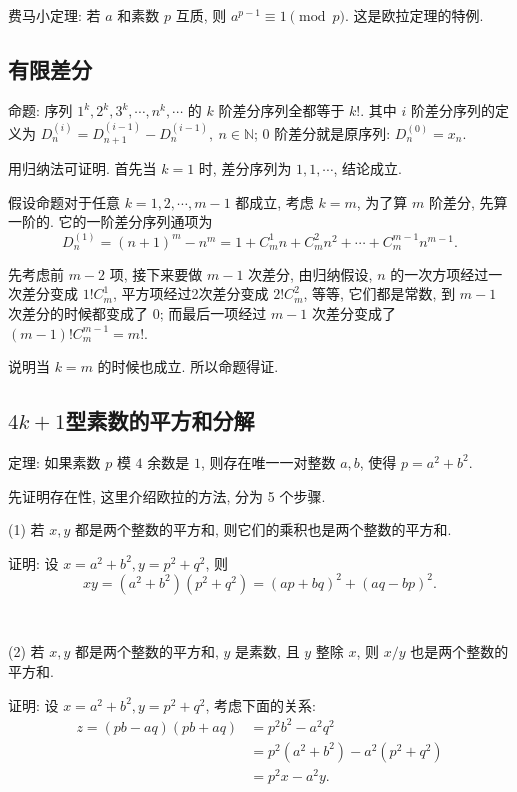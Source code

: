 ~

\noindent 费马小定理: 若 $ a $ 和素数 $ p $ 互质, 则 $ a^{p-1} \equiv 1 \pmod{p} $. 这是欧拉定理的特例.

\subsection{有限差分}

命题: 序列 $ 1^k, 2^k, 3^k, \cdots, n^k, \cdots $ 的 $ k $ 阶差分序列全都等于 $ k! $. 其中 $ i $ 阶差分序列的定义为 $ D^{(i)}_n = D^{(i-1)}_{n+1} - D^{(i-1)}_n, \ n\in\mathbb{N} $; $ 0 $ 阶差分就是原序列: $ D^{(0)}_n = x_n $.

用归纳法可证明. 首先当 $ k = 1 $ 时, 差分序列为 $ 1, 1, \cdots $, 结论成立.

假设命题对于任意 $ k = 1, 2, \cdots, m - 1 $ 都成立, 考虑 $ k = m $, 为了算 $m$ 阶差分, 先算一阶的. 它的一阶差分序列通项为 
$$ D^{(1)}_n = (n+1)^{m} - n^m = 1 + C_m^1n + C_m^2n^2+\cdots+C_m^{m-1}n^{m-1} .$$ 

先考虑前 $ m - 2 $ 项, 接下来要做 $ m - 1 $ 次差分, 由归纳假设, $ n $ 的一次方项经过一次差分变成 $ 1!C_m^1 $, 平方项经过2次差分变成 $ 2!C_m^2 $, 等等, 它们都是常数, 到 $ m - 1 $ 次差分的时候都变成了 $ 0 $; 而最后一项经过 $ m - 1 $ 次差分变成了 $ (m-1)!C_m^{m-1} = m! $. 

说明当 $ k = m $ 的时候也成立. 所以命题得证.

\subsection{\texorpdfstring{$4k+1$}{4k+1}型素数的平方和分解}

\noindent 定理: 如果素数 $ p $ 模 $ 4 $ 余数是 $ 1 $, 则存在唯一一对整数 $a,b$, 使得 $ p = a^2 + b^2 $.

先证明存在性, 这里介绍欧拉的方法, 分为 5 个步骤.

\noindent (1) 若 $ x,y $ 都是两个整数的平方和, 则它们的乘积也是两个整数的平方和.

证明: 设 $ x = a^2+b^2, y = p^2+q^2 $, 则 \[ xy = (a^2+b^2)(p^2+q^2)=(ap+bq)^2+(aq-bp)^2 .\]

~

\noindent (2) 若 $ x,y $ 都是两个整数的平方和, $ y $ 是素数, 且 $ y $ 整除 $ x $, 则 $ x/y $ 也是两个整数的平方和.

证明: 设 $ x = a^2+b^2, y = p^2+q^2 $, 考虑下面的关系:
\begin{align*} 
z = (pb-aq)(pb+aq) & = p^2b^2-a^2q^2 \\
	& = p^2(a^2+b^2)-a^2(p^2+q^2)\\
	& =p^2x-a^2y.
\end{align*}

